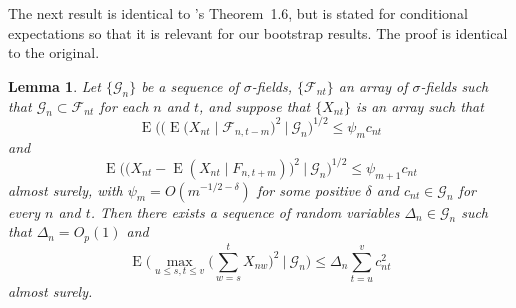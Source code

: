 \documentclass[11pt]{article}
\newcommand\citepos[2][]{\citeauthor{#2}'s \citeyearpar[#1]{#2}}
\newtheorem{lem}{Lemma}
\theoremstyle{definition}
\DeclareMathOperator{\E}{E}
\begin{document}
The next result is identical to \citepos{Mcl:75} Theorem~1.6, but is
stated for conditional expectations so that it is relevant for our
bootstrap results. The proof is identical to the original.
\begin{lem}\label{res:16}
  Let $\{\mathcal{G}_n\}$ be a sequence of $\sigma$-fields,
  $\{\mathcal{F}_{nt}\}$ an array of $\sigma$-fields such that
  $\mathcal{G}_n \subset \mathcal{F}_{nt}$ for each $n$ and $t$, and
  suppose that $\{X_{nt}\}$ is an array such that
  \begin{equation*}
    \E\big(\big( \E( X_{nt} \mid \mathcal{F}_{n,t-m} \big)^2 \ \big|\
    \mathcal{G}_n\big)^{1/2} \leq \psi_m c_{nt}
  \end{equation*}
  and
\begin{equation*}
  \E\big(\big(X_{nt} - \E( X_{nt}\mid F_{n,t+m}) \big)^2 \ \big|\
  \mathcal{G}_n\big)^{1/2} \leq \psi_{m+1} c_{nt}  
\end{equation*}
almost surely, with $\psi_m = O(m^{-1/2-\delta})$ for some positive
$\delta$ and $c_{nt} \in \mathcal{G}_n$ for every $n$ and $t$.  Then
there exists a sequence of random variables $\Delta_n \in
\mathcal{G}_n$ such that $\Delta_n = O_p(1)$ and
\begin{equation}\label{eq:40}
  \E\Big( \max_{u \leq s, t \leq v} \Big(\sum_{w=s}^t X_{nw}\Big)^2 \ \Big|\
  \mathcal{G}_n\Big) \leq \Delta_n \sum_{t=u}^v c_{nt}^2
\end{equation}
almost surely.
\end{lem}
\end{document}
